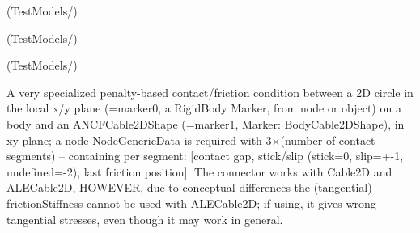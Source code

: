 \item {} (TestModels/)
\item {} (TestModels/)
\item {} (TestModels/)

\ei

%
\newpage


\label{sec:item:ObjectContactFrictionCircleCable2D}
A very specialized penalty-based contact/friction condition between a 2D circle in the local x/y plane (=marker0, a RigidBody Marker, from node or object) on a body and an ANCFCable2DShape (=marker1, Marker: BodyCable2DShape), in xy-plane; a node NodeGenericData is required with 3$\times$(number of contact segments) -- containing per segment: [contact gap, stick/slip (stick=0, slip=+-1, undefined=-2), last friction position]. The connector works with Cable2D and ALECable2D, HOWEVER, due to conceptual differences the (tangential) frictionStiffness cannot be used with ALECable2D; if using, it gives wrong tangential stresses, even though it may work in general.
\vspace{12pt}\\

